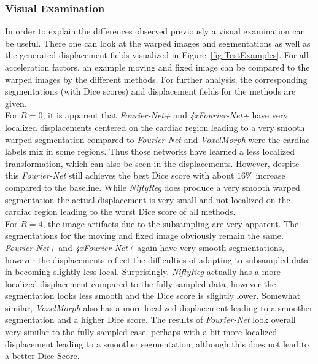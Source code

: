 \documentclass[english,version-2022-01]{uzl-thesis} %
\begin{document}
\subsubsection{Visual Examination}
In order to explain the differences observed previously a visual examination can be useful. There one can look at the warped images and segmentations as well as the generated displacement fields visualized in Figure~\ref{fig:TestExamples}. For all acceleration factors, an example moving and fixed image can be compared to the warped images by the different methods. For further analysis, the corresponding segmentations (with Dice scores) and displacement fields for the methods are given.\\
For $R=0$, it is apparent that \emph{Fourier-Net+} and \emph{4xFourier-Net+} have very localized displacements centered on the cardiac region leading to a very smooth warped segmentation compared to \emph{Fourier-Net} and \emph{VoxelMorph} were the cardiac labels mix in some regions. Thus those networks have learned a less localized transformation, which can also be seen in the displacements. However, despite this \emph{Fourier-Net} still achieves the best Dice score with about $16\%$ increase compared to the baseline. While \emph{NiftyReg} does produce a very smooth warped segmentation the actual displacement is very small and not localized on the cardiac region leading to the worst Dice score of all methods.\\
For $R=4$, the image artifacts due to the subsampling are very apparent. The segmentations for the moving and fixed image obviously remain the same.
\emph{Fourier-Net+} and \emph{4xFourier-Net+} again have very smooth segmentations, however the displacements reflect the difficulties of adapting to subsampled data in becoming slightly less local. Surprisingly, \emph{NiftyReg} actually has a more localized displacement compared to the fully sampled data, however the segmentation looks less smooth and the Dice score is slightly lower. Somewhat similar, \emph{VoxelMorph} also has a more localized displacement leading to a smoother segmentation and a higher Dice score. The results of \emph{Fourier-Net} look overall very similar to the fully sampled case, perhaps with a bit more localized displacement leading to a smoother segmentation, although this does not lead to a better Dice Score.\\
\end{document}
